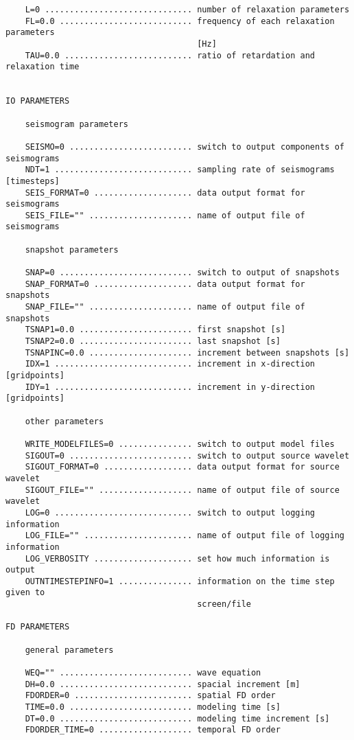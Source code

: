 \begin{verbatim}
    L=0 .............................. number of relaxation parameters
    FL=0.0 ........................... frequency of each relaxation parameters 
                                       [Hz]
    TAU=0.0 .......................... ratio of retardation and relaxation time
    

IO PARAMETERS
    
    seismogram parameters
    
    SEISMO=0 ......................... switch to output components of seismograms
    NDT=1 ............................ sampling rate of seismograms [timesteps]
    SEIS_FORMAT=0 .................... data output format for seismograms
    SEIS_FILE="" ..................... name of output file of seismograms
    
    snapshot parameters
    
    SNAP=0 ........................... switch to output of snapshots
    SNAP_FORMAT=0 .................... data output format for snapshots
    SNAP_FILE="" ..................... name of output file of snapshots
    TSNAP1=0.0 ....................... first snapshot [s]
    TSNAP2=0.0 ....................... last snapshot [s]
    TSNAPINC=0.0 ..................... increment between snapshots [s]
    IDX=1 ............................ increment in x-direction [gridpoints]
    IDY=1 ............................ increment in y-direction [gridpoints]
    
    other parameters
    
    WRITE_MODELFILES=0 ............... switch to output model files
    SIGOUT=0 ......................... switch to output source wavelet
    SIGOUT_FORMAT=0 .................. data output format for source wavelet
    SIGOUT_FILE="" ................... name of output file of source wavelet
    LOG=0 ............................ switch to output logging information
    LOG_FILE="" ...................... name of output file of logging information
    LOG_VERBOSITY .................... set how much information is output
    OUTNTIMESTEPINFO=1 ............... information on the time step given to
                                       screen/file

FD PARAMETERS
    
    general parameters
    
    WEQ="" ........................... wave equation
    DH=0.0 ........................... spacial increment [m]
    FDORDER=0 ........................ spatial FD order 
    TIME=0.0 ......................... modeling time [s]
    DT=0.0 ........................... modeling time increment [s]
    FDORDER_TIME=0 ................... temporal FD order
    

\end{verbatim}
